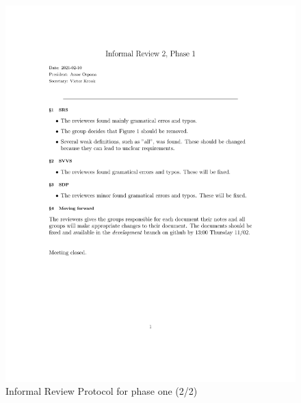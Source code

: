 \documentclass{article}
\begin{document}
\begin{figure}
     \centering
     \includegraphics[width=13cm]{images/Phase1_2021_02_10-1}
     \renewcommand\figurename{Figure}
      \caption{Informal Review Protocol for phase one (2/2)}
     \label{fig:my_label}
 \end{figure}
 
\end{document}
